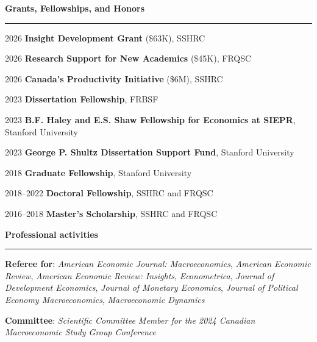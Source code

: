 \documentclass[12pt]{article}
\begin{document}
\vspace{0.5cm}

{\large \textbf{Grants, Fellowships, and Honors}} \\
\noindent\rule[0.5\baselineskip]{\textwidth}{1pt}

\begin{small}

2026 \tabto{3cm} \textbf{Insight Development Grant} (\$63K), SSHRC

2026 \tabto{3cm} \textbf{Research Support for New Academics} (\$45K), FRQSC

2026 \tabto{3cm} \textbf{Canada's Productivity Initiative} (\$6M), SSHRC

2023 \tabto{3cm} \textbf{Dissertation Fellowship}, FRBSF

2023 \tabto{3cm} \textbf{B.F. Haley and E.S. Shaw Fellowship for Economics at SIEPR}, Stanford University

2023 \tabto{3cm} \textbf{George P. Shultz Dissertation Support Fund}, Stanford University

2018 \tabto{3cm} \textbf{Graduate Fellowship}, Stanford University

2018--2022 \tabto{3cm} \textbf{Doctoral Fellowship}, SSHRC and FRQSC

2016--2018 \tabto{3cm} \textbf{Master's Scholarship}, SSHRC and FRQSC
\end{small}

\vspace{0.5cm}

{\large \textbf{Professional activities}} \\
\noindent\rule[0.5\baselineskip]{\textwidth}{1pt}

{\small \textbf{Referee for}: \textit{American Economic Journal: Macroeconomics}, \textit{American Economic Review}, \textit{American Economic Review: Insights}, \textit{Econometrica}, \textit{Journal of Development Economics}, \textit{Journal of Monetary Economics}, \textit{Journal of Political Economy Macroeconomics}, \textit{Macroeconomic Dynamics}}

{\small \textbf{Committee}: \textit{Scientific Committee Member for the 2024 Canadian Macroeconomic Study Group Conference}}
\end{document}
